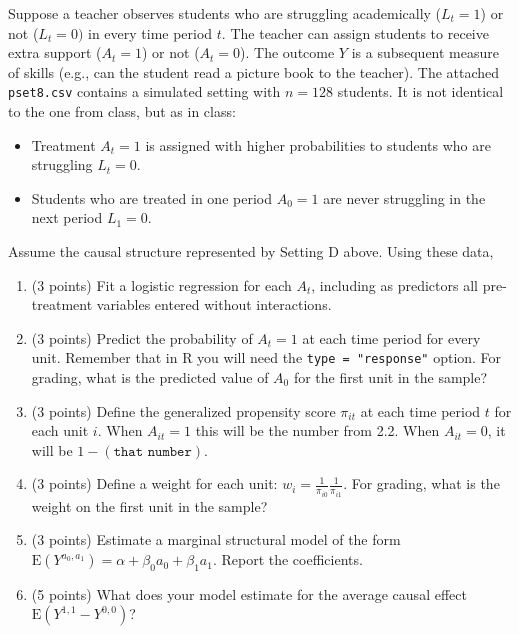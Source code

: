 \documentclass[10pt]{article}
\newcommand{\E}{\textrm{E}}
\begin{document}
Suppose a teacher observes students who are struggling academically ($L_t = 1$) or not ($L_t = 0)$ in every time period $t$. The teacher can assign students to receive extra support ($A_t = 1$) or not ($A_t = 0$). The outcome $Y$ is a subsequent measure of skills (e.g., can the student read a picture book to the teacher). The attached \texttt{pset8.csv} contains a simulated setting with $n = 128$ students. It is not identical to the one from class, but as in class:
\begin{itemize}
    \item Treatment $A_t = 1$ is assigned with higher probabilities to students who are struggling $L_t = 0$.
    \item Students who are treated in one period $A_0 = 1$ are never struggling in the next period $L_1 = 0$.
\end{itemize}
Assume the causal structure represented by Setting D above. Using these data,
\begin{enumerate}
    \item (3 points) Fit a logistic regression for each $A_t$, including as predictors all pre-treatment variables entered without interactions.
    \item (3 points) Predict the probability of $A_t = 1$ at each time period for every unit. Remember that in R you will need the \texttt{type = "response"} option. For grading, what is the predicted value of $A_0$ for the first unit in the sample?
    \item (3 points) Define the generalized propensity score $\pi_{it}$ at each time period $t$ for each unit $i$. When $A_{it} = 1$ this will be the number from 2.2. When $A_{it} = 0$, it will be $1 - (\texttt{that number})$.
    \item (3 points) Define a weight for each unit: $w_i = \frac{1}{\pi_{i0}}\frac{1}{\pi_{i1}}$. For grading, what is the weight on the first unit in the sample?
    \item (3 points) Estimate a marginal structural model of the form $\E(Y^{a_0,a_1}) = \alpha + \beta_0 a_0 + \beta_1 a_1$. Report the coefficients.
    \item (5 points) What does your model estimate for the average causal effect $\E(Y^{1,1} - Y^{0,0})$?
\end{enumerate}
\end{document}
